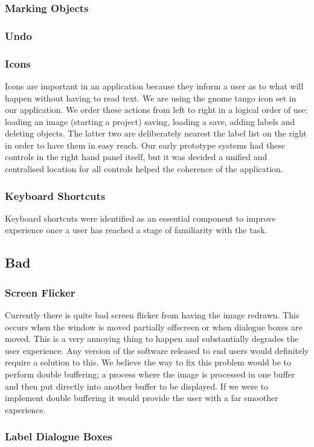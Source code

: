 \documentclass[a4paper,11pt,oneside]{article}
\begin{document}
\subsubsection{Marking Objects}
\subsubsection{Undo}
\subsubsection{Icons}
Icons are important in an application because they inform a user as to what will
happen without having to read text.  We are using the gnome tango icon set in
our application.  We order these actions from left to right in a logical order
of use: loading an image (starting a project) saving, loading a save, adding
labels and deleting objects. The latter two are deliberately nearest the label
list on the right in order to have them in easy reach. Our early prototype
systems had these controls in the right hand panel itself, but it was decided a
unified and centralised location for all controls helped the coherence of the
application.
\subsubsection{Keyboard Shortcuts}
Keyboard shortcuts were identified as an essential component to improve
experience once a user has reached a stage of familiarity with the task.
\subsection{Bad}
\subsubsection{Screen Flicker}
Currently there is quite bad screen flicker from having the image redrawn.  This
occurs when the window is moved partially offscreen or when dialogue boxes are
moved.  This is a very annoying thing to happen and substantially degrades the
user experience. Any version of the software released to end users would
definitely require a solution to this.  We believe the way to fix this problem
would be to perform double buffering; a process where the image is processed in
one buffer and then put directly into another buffer to be displayed.  If we
were to implement double buffering it would provide the user with a far smoother
experience.
\subsubsection{Label Dialogue Boxes}
\end{document}
